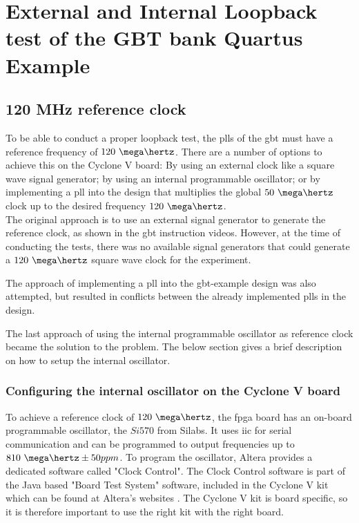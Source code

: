 \documentclass[main.tex]{subfiles}
\begin{document}
\chapter{External and Internal Loopback test of the GBT bank Quartus Example}

\section{120 MHz reference clock}

To be able to conduct a proper loopback test, the \glspl{pll} of the \gls{gbt}  must have a reference frequency of $120~\mega\hertz$. There are a number of options to achieve this on the Cyclone V board: By using an external clock like a square wave signal generator; by using an internal programmable oscillator; or by implementing a \gls{pll} into the design that multiplies the global $50~\mega\hertz$ clock up to the desired frequency $120~\mega\hertz$. \\

The original approach is to use an external signal generator to generate the reference clock, as shown in the \gls{gbt} instruction videos. However, at the time of conducting the tests, there was no available signal generators that could generate a $120~\mega\hertz$ square wave clock for the experiment. 

The approach of implementing a \gls{pll} into the \gls{gbt}-example design was also attempted, but resulted in conflicts between the already implemented \glspl{pll} in the design. 

The last approach of using the internal programmable oscillator as reference clock became the solution to the problem. The below section gives a brief description on how to setup the internal oscillator.

\subsection{Configuring the internal oscillator on the Cyclone V board}

To achieve a reference clock of $120~\mega\hertz$, the \gls{fpga} board has an on-board programmable oscillator, the $Si570$ from Silabs. It uses \gls{iic} for serial communication and can be programmed to output frequencies up to $810~\mega\hertz \pm 50 ppm$. To program the oscillator, Altera provides a dedicated software called "Clock Control". The Clock Control software is part of the Java based "Board Test System" software, included in the Cyclone V kit which can be found at Altera's websites \cite{altera_cyclonekit}. The Cyclone V kit is board specific, so it is therefore important to use the right kit with the right board.\\
\end{document}
